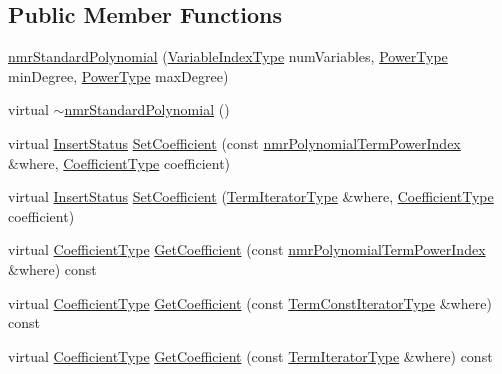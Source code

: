 \subsection*{Public Member Functions}
\begin{DoxyCompactItemize}
\item 
\hyperlink{classnmr_standard_polynomial_a3d2dfe48e85cab4978e4d1263a4e986b}{nmr\-Standard\-Polynomial} (\hyperlink{classnmr_polynomial_base_aae95477e451ddc7d3ee3f41cbdaadde2}{Variable\-Index\-Type} num\-Variables, \hyperlink{classnmr_polynomial_base_a58607c884bf2e6725a77ed4d9e14ba26}{Power\-Type} min\-Degree, \hyperlink{classnmr_polynomial_base_a58607c884bf2e6725a77ed4d9e14ba26}{Power\-Type} max\-Degree)
\item 
virtual \hyperlink{classnmr_standard_polynomial_a24d2a860f338052936536904b40e1e08}{$\sim$nmr\-Standard\-Polynomial} ()
\item 
virtual \hyperlink{classnmr_polynomial_base_ac3b6b28653104ea70419279a35580940}{Insert\-Status} \hyperlink{classnmr_standard_polynomial_a57f4a28dfc2a2a6030bbb9b82683924e}{Set\-Coefficient} (const \hyperlink{classnmr_polynomial_term_power_index}{nmr\-Polynomial\-Term\-Power\-Index} \&where, \hyperlink{classnmr_polynomial_base_a8693efdfc8585ccb49abea69f74f3eef}{Coefficient\-Type} coefficient)
\item 
virtual \hyperlink{classnmr_polynomial_base_ac3b6b28653104ea70419279a35580940}{Insert\-Status} \hyperlink{classnmr_standard_polynomial_ad74e6eb31017644b058027d3bafa263d}{Set\-Coefficient} (\hyperlink{classnmr_polynomial_container_a276e57445d038e8a16462f47b85719a3}{Term\-Iterator\-Type} \&where, \hyperlink{classnmr_polynomial_base_a8693efdfc8585ccb49abea69f74f3eef}{Coefficient\-Type} coefficient)
\item 
virtual \hyperlink{classnmr_polynomial_base_a8693efdfc8585ccb49abea69f74f3eef}{Coefficient\-Type} \hyperlink{classnmr_standard_polynomial_a8cb71742bffdae28873a6646a8fa3a9c}{Get\-Coefficient} (const \hyperlink{classnmr_polynomial_term_power_index}{nmr\-Polynomial\-Term\-Power\-Index} \&where) const 
\item 
virtual \hyperlink{classnmr_polynomial_base_a8693efdfc8585ccb49abea69f74f3eef}{Coefficient\-Type} \hyperlink{classnmr_standard_polynomial_adacf2ad64351421df2364f61bbc44dd2}{Get\-Coefficient} (const \hyperlink{classnmr_polynomial_container_aba8d31506ab6a487fdc4fe2815469442}{Term\-Const\-Iterator\-Type} \&where) const 
\item 
virtual \hyperlink{classnmr_polynomial_base_a8693efdfc8585ccb49abea69f74f3eef}{Coefficient\-Type} \hyperlink{classnmr_standard_polynomial_a005eea5f7e6c10d15b99e347563cc507}{Get\-Coefficient} (const \hyperlink{classnmr_polynomial_container_a276e57445d038e8a16462f47b85719a3}{Term\-Iterator\-Type} \&where) const 

\end{DoxyCompactItemize}

